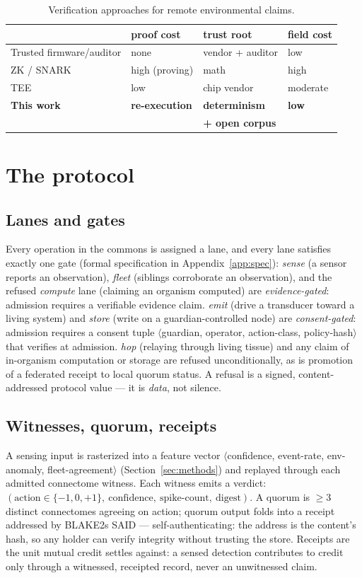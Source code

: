 \documentclass[pdflatex,sn-basic]{sn-jnl}
\begin{document}
\begin{table}[t]
\centering\small
\caption{Verification approaches for remote environmental claims.}
\label{tab:compare}
\begin{tabular}{@{}llll@{}}
\toprule
 & proof cost & trust root & field cost \\
\midrule
Trusted firmware/auditor & none & vendor + auditor & low \\
ZK / SNARK \cite{groth2016} & high (proving) & math & high \\
TEE \cite{costan2016} & low & chip vendor & moderate \\
\textbf{This work} & \textbf{re-execution}
 & \textbf{determinism} & \textbf{low} \\
 & & \textbf{+ open corpus} & \\
\bottomrule
\end{tabular}
\end{table}

\section{The protocol}\label{sec:arch}
\subsection{Lanes and gates}
Every operation in the commons is assigned a lane, and every lane
satisfies exactly one gate (formal specification in
Appendix~\ref{app:spec}):
\emph{sense} (a sensor reports an observation),
\emph{fleet} (siblings corroborate an observation), and the refused
\emph{compute} lane (claiming an organism computed) are
\emph{evidence-gated}: admission requires a verifiable evidence claim.
\emph{emit} (drive a transducer toward a living system) and
\emph{store} (write on a guardian-controlled node) are
\emph{consent-gated}: admission requires a consent tuple
$\langle$guardian, operator, action-class, policy-hash$\rangle$ that
verifies at admission. \emph{hop} (relaying through living tissue)
and any claim of in-organism computation or storage are refused
unconditionally, as is promotion of a federated receipt to local
quorum status. A refusal is a signed, content-addressed protocol
value --- it is \emph{data}, not silence.

\subsection{Witnesses, quorum, receipts}
A sensing input is rasterized into a feature vector
$\langle$confidence, event-rate, env-anomaly, fleet-agreement$\rangle$
(Section~\ref{sec:methods}) and replayed through each admitted
connectome witness. Each witness emits a verdict:
$(\text{action} \in \{-1,0,+1\},\ \text{confidence},
\ \text{spike-count},\ \text{digest})$. A quorum is $\ge 3$
distinct connectomes agreeing on action; quorum output folds into a
receipt addressed by BLAKE2s SAID --- self-authenticating: the
address is the content's hash, so any holder can verify integrity
without trusting the store. Receipts are the unit mutual credit
settles against: a sensed detection contributes to credit only
through a witnessed, receipted record, never an unwitnessed claim.
\end{document}
